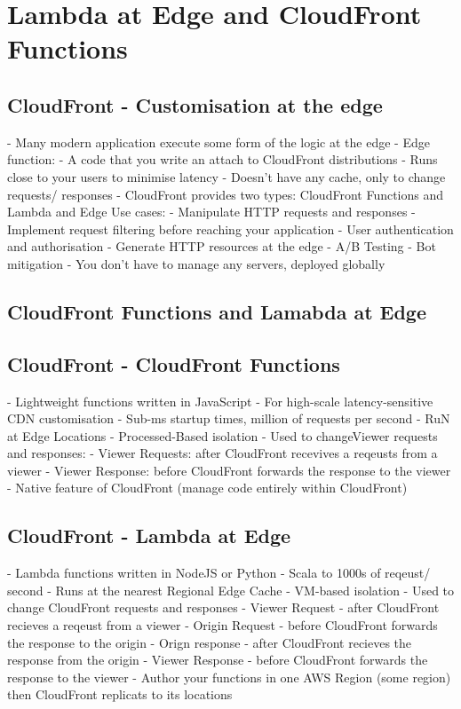 \documentclass[11pt]{book}
\begin{document}
    \section{Lambda at Edge and CloudFront Functions}

    \subsection{CloudFront - Customisation at the edge}
    - Many modern application execute some form of the logic at the edge
    - Edge function:
    - A code that you write an attach to CloudFront distributions
    - Runs close to your users to minimise latency
    - Doesn't have any cache, only to change requests/ responses
    - CloudFront provides two types: CloudFront Functions and Lambda and Edge
    Use cases:
    - Manipulate HTTP requests and responses
    - Implement request filtering before reaching your application
    - User authentication and authorisation
    - Generate HTTP resources at the edge
    - A/B Testing
    - Bot mitigation
    - You don't have to manage any servers, deployed globally

    \subsection{CloudFront Functions and Lamabda at Edge}

    \subsection{CloudFront - CloudFront Functions}
    - Lightweight functions written in JavaScript
    - For high-scale latency-sensitive CDN customisation
    - Sub-ms startup times, million of requests per second
    - RuN at Edge Locations
    - Processed-Based isolation
    - Used to changeViewer requests and responses:
    - Viewer Requests: after CloudFront recevives a reqeusts from a viewer
    - Viewer Response: before CloudFront forwards the response to the viewer
    - Native feature of CloudFront (manage code entirely within CloudFront)

    \subsection{CloudFront - Lambda at Edge}
    - Lambda functions written in NodeJS or Python
    - Scala to 1000s of reqeust/ second
    - Runs at the nearest Regional Edge Cache
    - VM-based isolation
    - Used to change CloudFront requests and responses
    - Viewer Request - after CloudFront recieves a reqeust from a viewer
    - Origin Request - before CloudFront forwards the response to the origin
    - Orign response - after CloudFront recieves the response from the origin
    - Viewer Response - before CloudFront forwards the response to the viewer
    - Author your functions in one AWS Region (some region) then CloudFront replicats to its locations
\end{document}
